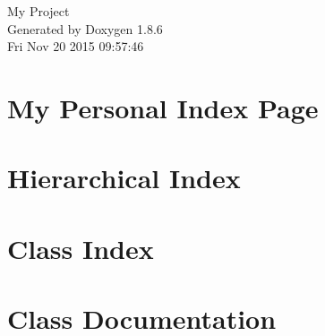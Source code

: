 \documentclass[twoside]{book}
\newcommand{\clearemptydoublepage}{%
  \newpage{\pagestyle{empty}\cleardoublepage}%
}
\begin{document}
\hypersetup{pageanchor=false}
\begin{titlepage}
\vspace*{7cm}
\begin{center}%
{\Large My Project }\\
\vspace*{1cm}
{\large Generated by Doxygen 1.8.6}\\
\vspace*{0.5cm}
{\small Fri Nov 20 2015 09:57:46}\\
\end{center}
\end{titlepage}
\clearemptydoublepage
\tableofcontents
\clearemptydoublepage
{}
\hypersetup{pageanchor=true}

\chapter{My Personal Index Page}
\label{index}\hypertarget{index}{}
\chapter{Hierarchical Index}

\chapter{Class Index}

\chapter{Class Documentation}


























































\newpage
{}
{}
\printindex
\end{document}
